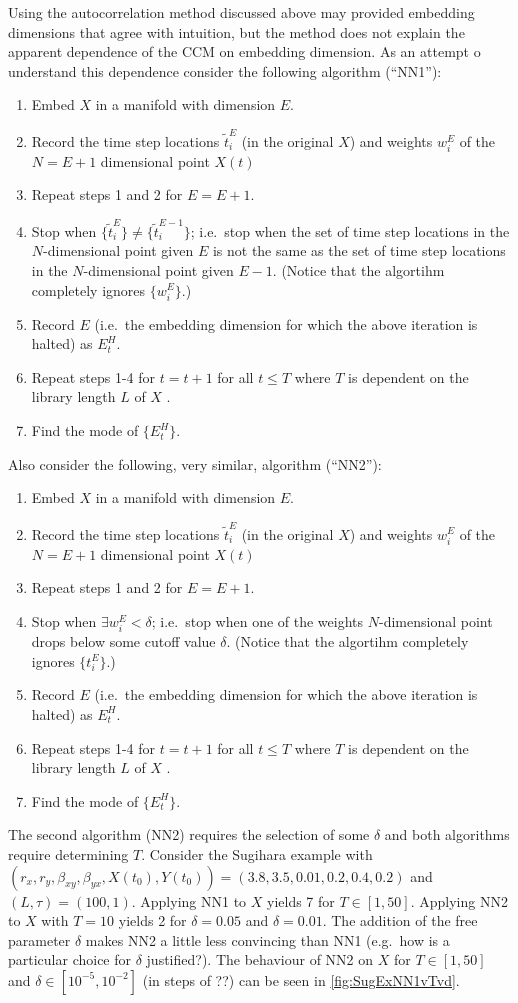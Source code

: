 \documentclass[a4paper,11pt]{article}
\begin{document}
Using the autocorrelation method discussed above may provided embedding dimensions that agree with intuition, but the method does not explain the apparent dependence of the CCM on embedding dimension.  As an attempt o understand this dependence consider the following algorithm (``NN1''): 
\begin{enumerate}
\item Embed $X$ in a manifold with dimension $E$.
\item Record the time step locations $\tilde{t}^E_i$ (in the original $X$) and weights $w^E_i$ of the $N=E+1$ dimensional point $X(t)$ 
\item Repeat steps 1 and 2 for $E=E+1$.
\item Stop when $\{\tilde{t}_i^E\} \neq \{\tilde{t}_i^{E-1}\}$; i.e.\ stop when the set of time step locations in the $N$-dimensional point given $E$ is not the same as the set of time step locations in the $N$-dimensional point given $E-1$.  (Notice that the algortihm completely ignores $\{w_i^E\}$.)
\item Record $E$ (i.e.\ the embedding dimension for which the above iteration is halted) as $E^H_t$.
\item Repeat steps 1-4 for $t=t+1$ for all $t\le T$ where $T$ is dependent on the library length $L$ of $X$ .
\item Find the mode of $\{E_t^H\}$.
\end{enumerate}
Also consider the following, very similar, algorithm (``NN2''):
\begin{enumerate}
\item Embed $X$ in a manifold with dimension $E$.
\item Record the time step locations $\tilde{t}^E_i$ (in the original $X$) and weights $w^E_i$ of the $N=E+1$ dimensional point $X(t)$ 
\item Repeat steps 1 and 2 for $E=E+1$.
\item Stop when $\exists w^E_i < \delta$; i.e.\ stop when one of the weights $N$-dimensional point drops below some cutoff value $\delta$.  (Notice that the algortihm completely ignores $\{t_i^E\}$.)
\item Record $E$ (i.e.\ the embedding dimension for which the above iteration is halted) as $E^H_t$.
\item Repeat steps 1-4 for $t=t+1$ for all $t\le T$ where $T$ is dependent on the library length $L$ of $X$ .
\item Find the mode of $\{E_t^H\}$.
\end{enumerate}
The second algorithm (NN2) requires the selection of some $\delta$ and both algorithms require determining $T$.  Consider the Sugihara example with $\left(r_x,r_y,\beta_{xy},\beta_{yx},X(t_0),Y(t_0)\right) = \left(3.8,3.5,0.01,0.2,0.4,0.2\right)$ and $\left(L,\tau\right) = \left(100,1\right)$.  Applying NN1 to $X$ yields 7 for $T\in[1,50]$.  Applying NN2 to $X$ with $T=10$ yields 2 for $\delta=0.05$ and $\delta=0.01$.  The addition of the free parameter $\delta$ makes NN2 a little less convincing than NN1 (e.g.\ how is a particular choice for $\delta$ justified?).  The behaviour of NN2 on $X$ for $T\in[1,50]$ and $\delta\in[10^{-5},10^{-2}]$ (in steps of ??) can be seen in \ref{fig:SugExNN1vTvd}.
\end{document}
